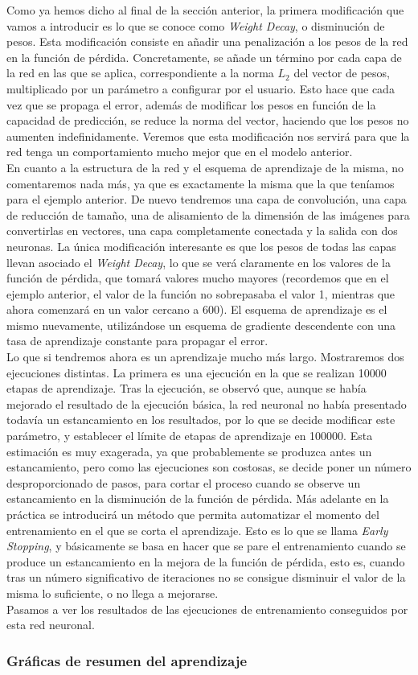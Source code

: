\documentclass[11pt]{article}
\theoremstyle{plain}
\theoremstyle{definition}
\begin{document}
Como ya hemos dicho al final de la sección anterior, la primera
modificación que vamos a introducir es lo que se conoce como
\textit{Weight Decay}, o disminución de pesos. Esta modificación
consiste en añadir una penalización a los pesos de la red en la
función de pérdida. Concretamente, se añade un término por cada capa
de la red en las que se aplica, correspondiente a la norma $L_2$ del
vector de pesos, multiplicado por un parámetro a configurar por el
usuario. Esto hace que cada vez que se propaga el error, además de
modificar los pesos en función de la capacidad de predicción, se
reduce la norma del vector, haciendo que los pesos no aumenten
indefinidamente. Veremos que esta modificación nos servirá para que
la red tenga un comportamiento mucho mejor que en el modelo anterior.\\

En cuanto a la estructura de la red y el esquema de aprendizaje de la
misma, no comentaremos nada más, ya que es exactamente la misma que la
que teníamos para el ejemplo anterior. De nuevo tendremos una capa de
convolución, una capa de reducción de tamaño, una de alisamiento de la
dimensión de las imágenes para convertirlas en vectores, una capa
completamente conectada y la salida con dos neuronas. La única
modificación interesante es que los pesos de todas las capas llevan
asociado el \textit{Weight Decay}, lo que se verá claramente en los
valores de la función de pérdida, que tomará valores mucho mayores
(recordemos que en el ejemplo anterior, el valor de la función no
sobrepasaba el valor 1, mientras que ahora comenzará en un valor
cercano a 600). El esquema de aprendizaje es el mismo nuevamente,
utilizándose un esquema de gradiente descendente
con una tasa de aprendizaje constante para propagar el error.\\

Lo que si tendremos ahora es un aprendizaje mucho más largo.
Mostraremos dos ejecuciones distintas. La primera es una ejecución en
la que se realizan 10000 etapas de aprendizaje. Tras la ejecución, se
observó que, aunque se había mejorado el resultado de la ejecución
básica, la red neuronal no había presentado todavía un estancamiento
en los resultados, por lo que se decide modificar este parámetro, y
establecer el límite de etapas de aprendizaje en 100000. Esta
estimación es muy exagerada, ya que probablemente se produzca antes un
estancamiento, pero como las ejecuciones son costosas, se decide poner
un número desproporcionado de pasos, para cortar el proceso cuando se
observe un estancamiento en la disminución de la función de pérdida.
Más adelante en la práctica se introducirá un método que permita
automatizar el momento del entrenamiento en el que se corta el
aprendizaje. Esto es lo que se llama \textit{Early Stopping}, y
básicamente se basa en hacer que se pare el entrenamiento cuando
se produce un estancamiento en la mejora de la función de pérdida,
esto es, cuando tras un número significativo de iteraciones no se
consigue disminuir el valor de la misma lo suficiente, o no llega
a mejorarse.\\

Pasamos a ver los resultados de las ejecuciones de entrenamiento
conseguidos por esta red neuronal.

\subsubsection{Gráficas de resumen del aprendizaje}

\printbibliography
\end{document}
